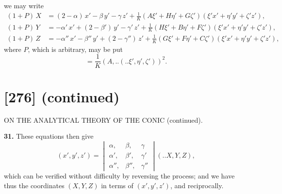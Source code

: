 \documentclass[12pt,a4paper]{article}
\newcommand{\qform}[2]{(#1 \mathbin{..} #2)}
\theoremstyle{definition}
\begin{document}
we may write
\begin{align*}
(1+P)\,X &= (2-\alpha)\,x' - \beta\,y' - \gamma\,z' + \tfrac{1}{K}(A\xi' + H\eta' + G\zeta')(\xi'x' + \eta'y' + \zeta'z'),\\
(1+P)\,Y &= -\alpha'\,x' + (2-\beta')\,y' - \gamma'\,z' + \tfrac{1}{K}(H\xi' + B\eta' + F\zeta')(\xi'x' + \eta'y' + \zeta'z'),\\
(1+P)\,Z &= -\alpha''\,x' - \beta''\,y' + (2-\gamma'')\,z' + \tfrac{1}{K}(G\xi' + F\eta' + C\zeta')(\xi'x' + \eta'y' + \zeta'z'),
\end{align*}
where $P$, which is arbitrary, may be put
\[
= \frac{1}{K}(A,..\!\qform{}{\xi', \eta', \zeta'})^{2}.
\]

\newpage
\section*{[276] (continued)}
\begin{center}
{\large ON THE ANALYTICAL THEORY OF THE CONIC (continued).}
\end{center}

\textbf{31.} These equations then give
\[
(x', y', z') =
\begin{vmatrix}
\alpha, & \beta, & \gamma \\
\alpha', & \beta', & \gamma' \\
\alpha'', & \beta'', & \gamma''
\end{vmatrix}
\!\qform{}{X, Y, Z},
\]
which can be verified without difficulty by reversing the process; and we have thus the coordinates $(X, Y, Z)$ in terms of $(x', y', z')$, and reciprocally.
\end{document}
